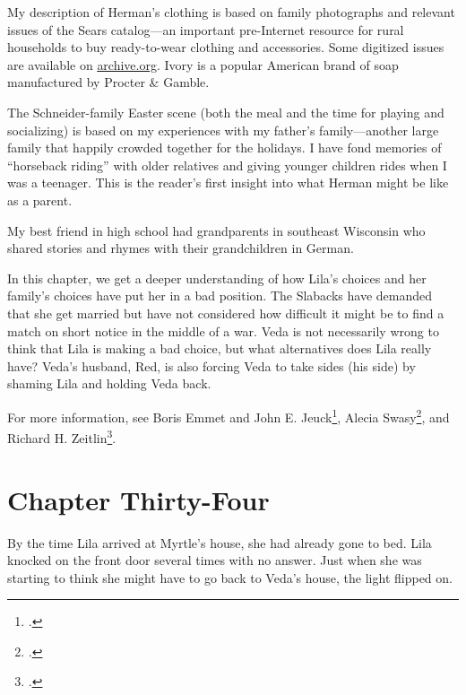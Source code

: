 \documentclass[
  letterpaper,
]{book}
\begin{document}
My description of Herman's clothing is based on family photographs and
relevant issues of the Sears catalog---an important pre-Internet
resource for rural households to buy ready-to-wear clothing and
accessories. Some digitized issues are available on
\href{http://archive.org/}{archive.org}. Ivory is a popular American
brand of soap manufactured by Procter \& Gamble.

The Schneider-family Easter scene (both the meal and the time for
playing and socializing) is based on my experiences with my father's
family---another large family that happily crowded together for the
holidays. I have fond memories of ``horseback riding'' with older
relatives and giving younger children rides when I was a teenager. This
is the reader's first insight into what Herman might be like as a
parent.

My best friend in high school had grandparents in southeast Wisconsin
who shared stories and rhymes with their grandchildren in German.

In this chapter, we get a deeper understanding of how Lila's choices and
her family's choices have put her in a bad position. The Slabacks have
demanded that she get married but have not considered how difficult it
might be to find a match on short notice in the middle of a war. Veda is
not necessarily wrong to think that Lila is making a bad choice, but
what alternatives does Lila really have? Veda's husband, Red, is also
forcing Veda to take sides (his side) by shaming Lila and holding Veda
back.

For more information, see Boris Emmet and John E. Jeuck\footnote{.}, Alecia Swasy\footnote{.}, and Richard H. Zeitlin\footnote{.}.


\chapter{Chapter Thirty-Four}\label{chapter-thirty-four}

By the time Lila arrived at Myrtle's house, she had already gone to bed.
Lila knocked on the front door several times with no answer. Just when
she was starting to think she might have to go back to Veda's house, the
light flipped on.
\end{document}
